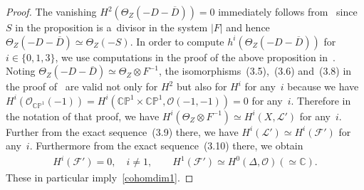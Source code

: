 \begin{proof}
The vanishing $H^2( \Theta_Z(-D-\overline D) ) = 0$ immediately follows from~\cite[Proposition~3.1]{HonCMP2} since $S$ in the
proposition is a~divisor in the system $|F|$ and hence $\Theta_Z(-D-\overline D)\simeq\Theta_Z(-S)$.
In order to compute $h^i(\Theta_Z(-D-\overline D) )$ for $i\in \{0,1,3\}$,
we use computations in the proof of the above proposition in~\cite{HonCMP2}.
Noting $\Theta_Z (-D-\overline D ) \simeq \Theta_Z\otimes F^{-1}$, the isomorphisms~(3.5),~(3.6) and~(3.8) in the proof
of~\cite[Proposition~3.1]{HonCMP2} are valid not only for $H^2$ but also for $H^i$ for any~$i$ because we have $H^i(\mathscr
O_{\mathbb{CP}^1} (-1))=H^i({\mathbb{CP}^1\times\mathbb{CP}^1},\mathscr O(-1,-1))=0$ for any~$i$.
Therefore in the notation of that proof, we have $H^i(\Theta_Z\otimes F^{-1}) \simeq H^i(X,\mathscr L')$ for any~$i$.
Further from the exact sequence~(3.9) there, we have $H^i(\mathscr L')\simeq H^i(\mathscr F')$ for any~$i$.
Furthermore from the exact sequence~(3.10) there, we obtain
\begin{gather*}
H^i(\mathscr F') = 0,
\quad
i\neq 1,
\qquad
H^1(\mathscr F')\simeq H^0(\Delta,\mathscr O)  (\simeq\mathbb{C}).
\end{gather*}
These in particular imply~\eqref{cohomdim1}.


\end{proof}
